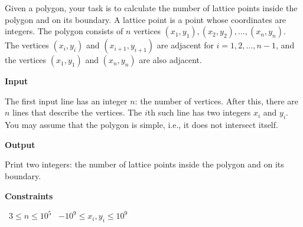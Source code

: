 Given a polygon, your task is to calculate the number of lattice points inside the polygon and on its boundary. A lattice point is a point whose coordinates are integers.
The polygon consists of $n$ vertices $(x_1,y_1),(x_2,y_2),\dots,(x_n,y_n)$. The vertices $(x_i,y_i)$ and $(x_{i+1},y_{i+1})$ are adjacent for $i=1,2,\dots,n-1$, and the vertices $(x_1,y_1)$ and $(x_n,y_n)$ are also adjacent.

\vspace{0.3cm}\noindent\textbf{Input}

The first input line has an integer $n$: the number of vertices.
After this, there are $n$ lines that describe the vertices. The $i$th such line has two integers $x_i$ and $y_i$.
You may assume that the polygon is simple, i.e., it does not intersect itself.

\vspace{0.3cm}\noindent\textbf{Output}

Print two integers: the number of lattice points inside the polygon and on its boundary.

\vspace{0.3cm}\noindent\textbf{Constraints}

\textbullet\ $3 \le n \le 10^5$
\textbullet\ $-10^9 \le x_i, y_i \le 10^9$